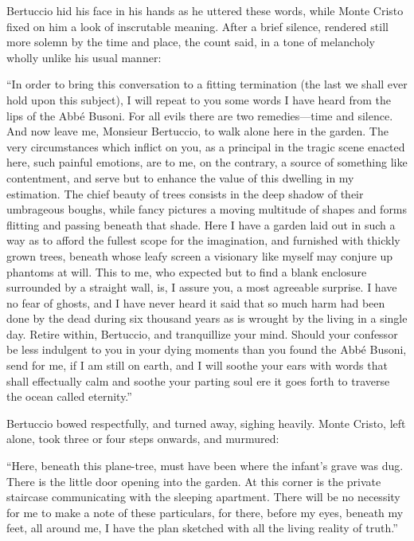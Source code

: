 Bertuccio hid his face in his hands as he uttered these words, while
Monte Cristo fixed on him a look of inscrutable meaning. After a brief
silence, rendered still more solemn by the time and place, the count
said, in a tone of melancholy wholly unlike his usual manner:

“In order to bring this conversation to a fitting termination (the last
we shall ever hold upon this subject), I will repeat to you some words
I have heard from the lips of the Abbé Busoni. For all evils there are
two remedies—time and silence. And now leave me, Monsieur Bertuccio, to
walk alone here in the garden. The very circumstances which inflict on
you, as a principal in the tragic scene enacted here, such painful
emotions, are to me, on the contrary, a source of something like
contentment, and serve but to enhance the value of this dwelling in my
estimation. The chief beauty of trees consists in the deep shadow of
their umbrageous boughs, while fancy pictures a moving multitude of
shapes and forms flitting and passing beneath that shade. Here I have a
garden laid out in such a way as to afford the fullest scope for the
imagination, and furnished with thickly grown trees, beneath whose
leafy screen a visionary like myself may conjure up phantoms at will.
This to me, who expected but to find a blank enclosure surrounded by a
straight wall, is, I assure you, a most agreeable surprise. I have no
fear of ghosts, and I have never heard it said that so much harm had
been done by the dead during six thousand years as is wrought by the
living in a single day. Retire within, Bertuccio, and tranquillize your
mind. Should your confessor be less indulgent to you in your dying
moments than you found the Abbé Busoni, send for me, if I am still on
earth, and I will soothe your ears with words that shall effectually
calm and soothe your parting soul ere it goes forth to traverse the
ocean called eternity.”

Bertuccio bowed respectfully, and turned away, sighing heavily. Monte
Cristo, left alone, took three or four steps onwards, and murmured:

“Here, beneath this plane-tree, must have been where the infant’s grave
was dug. There is the little door opening into the garden. At this
corner is the private staircase communicating with the sleeping
apartment. There will be no necessity for me to make a note of these
particulars, for there, before my eyes, beneath my feet, all around me,
I have the plan sketched with all the living reality of truth.”

